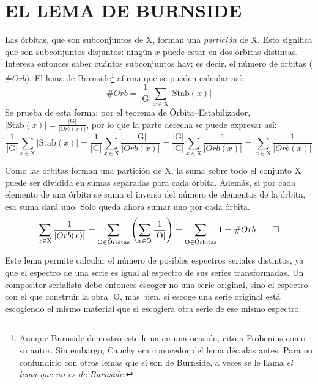 	\section{EL LEMA DE BURNSIDE}
		\label{burnside}
		Las órbitas, que son subconjuntos de X, forman una \emph{partición} de X. Esto significa que son subconjuntos disjuntos: ningún $x$ puede estar en dos órbitas distintas. Interesa entonces saber cuántos subconjuntos hay; es decir, el número de órbitas ($\#Orb$). El lema de Burnside\footnote{Aunque Burnside demostró este lema en una ocasión, citó a Frobenius como su autor. Sin embargo, Cauchy era conocedor del lema décadas antes. Para no confundirlo con otros lemas que sí son de Burnside, a veces se le llama \emph{el lema que no es de Burnside.}} afirma que se pueden calcular así:
		$$\#Orb=\frac{1}{|\text{G}|}\sum_{x\in\text{X}}|\text{Stab}(x)|$$	
		Se prueba de esta forma: por el teorema de Órbita--Estabilizador, $|\text{Stab}(x)|=\frac{|\text{G}|}{|Orb(x)|}$, por lo que la parte derecha se puede expresar así:
		$$\frac{1}{|\text{G}|}\sum_{x\in\text{X}}|\text{Stab}(x)|=\frac{1}{|\text{G}|}\sum_{x\in\text{X}}\frac{|\text{G}|}{|Orb(x)|}=\frac{|\text{G}|}{|\text{G}|}\sum_{x\in\text{X}}\frac{1}{|Orb(x)|}=\sum_{x\in\text{X}}\frac{1}{|Orb(x)|}$$

		Como las órbitas forman una partición de X, la suma sobre todo el conjunto X puede ser dividida en sumas separadas para cada órbita. Además, si por cada elemento de una órbita se suma el inverso del número de elementos de la órbita, esa suma dará uno. Solo queda ahora sumar uno por cada órbita.
		$$\sum_{x\in\text{X}}\frac{1}{|Orb(x)|}=\sum_{\text{O}\in\text{Órbitas}}\left(\sum_{x\in\text{O}}\frac{1}{|\text{O}|}\right)=\sum_{\text{O}\in\text{Órbitas}}1=\#Orb \qed$$	
	
		Este lema permite calcular el número de posibles espectros seriales distintos, ya que el espectro de una serie es igual al espectro de sus series transformadas. Un compositor serialista debe entonces escoger no una serie original, sino el espectro con el que construir la obra. O, más bien, si escoge una serie original está escogiendo el mismo material que si escogiera otra serie de ese mismo espectro.